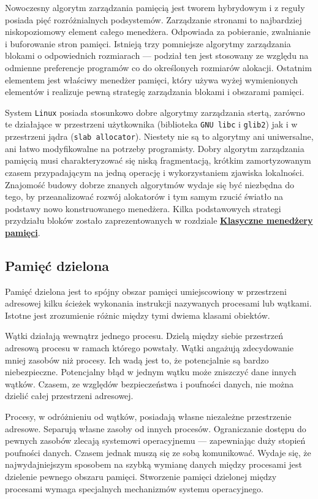 \documentclass[12pt,a4paper,titlepage,twoside]{mwart}
\begin{document}
Nowoczesny algorytm zarządzania pamięcią jest tworem hybrydowym i z reguły
posiada pięć rozróżnialnych podsystemów. Zarządzanie stronami to najbardziej
niskopoziomowy element całego menedżera. Odpowiada za pobieranie, zwalnianie i
buforowanie stron pamięci. Istnieją trzy pomniejsze algorytmy zarządzania
blokami o odpowiednich rozmiarach --- podział ten jest stosowany ze względu na
odmienne preferencje programów co do określonych rozmiarów alokacji. Ostatnim
elementem jest właściwy menedżer pamięci, który używa wyżej wymienionych
elementów i realizuje pewną strategię zarządzania blokami i obszarami pamięci.

System \texttt{Linux} posiada stosunkowo dobre algorytmy zarządzania stertą,
zarówno te działające w przestrzeni użytkownika (biblioteka \texttt{GNU libc} i
\texttt{glib2}) jak i w przestrzeni jądra (\texttt{slab allocator}). Niestety
nie są to algorytmy ani uniwersalne, ani łatwo modyfikowalne na potrzeby
programisty. Dobry algorytm zarządzania pamięcią musi charakteryzować się niską
fragmentacją, krótkim zamortyzowanym czasem przypadającym na jedną operację i
wykorzystaniem zjawiska lokalności. Znajomość budowy dobrze znanych algorytmów
wydaje się być niezbędna do tego, by przeanalizować rozwój alokatorów i tym
samym rzucić światło na podstawy nowo konstruowanego menedżera. Kilka
podstawowych strategi przydziału bloków zostało zaprezentowanych w rozdziale
\hyperlink{Klasyka}{\textbf{Klasyczne menedżery pamięci}}.

\subsection{Pamięć dzielona}

Pamięć dzielona jest to spójny obszar pamięci umiejscowiony w przestrzeni
adresowej kilku ścieżek wykonania instrukcji nazywanych procesami lub wątkami.
Istotne jest zrozumienie różnic między tymi dwiema klasami obiektów.

Wątki działają wewnątrz jednego procesu. Dzielą między siebie przestrzeń
adresową procesu w ramach którego powstały. Wątki angażują zdecydowanie mniej
zasobów niż procesy. Ich wadą jest to, że potencjalnie są bardzo niebezpieczne.
Potencjalny błąd w jednym wątku może zniszczyć dane innych wątków. Czasem, ze
względów bezpieczeństwa i poufności danych, nie można dzielić całej przestrzeni
adresowej.

Procesy, w odróżnieniu od wątków, posiadają własne niezależne przestrzenie
adresowe. Separują własne zasoby od innych procesów. Ograniczanie dostępu do
pewnych zasobów zlecają systemowi operacyjnemu --- zapewniając duży stopień
poufności danych. Czasem jednak muszą się ze sobą komunikować. Wydaje się, że
najwydajniejszym sposobem na szybką wymianę danych między procesami jest
dzielenie pewnego obszaru pamięci. Stworzenie pamięci dzielonej między
procesami wymaga specjalnych mechanizmów systemu operacyjnego.
\end{document}
